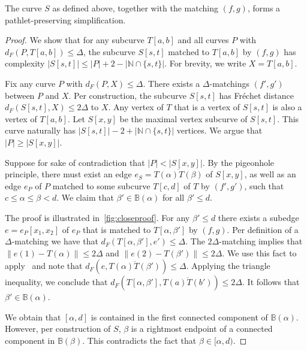 \documentclass[a4paper,UKenglish,cleveref,thm-restate,notab]{lipics-v2021}
\newcommand{\f}{Fr\'echet\xspace}
\newcommand{\dF}{\ensuremath{d_F}}
\newcommand{\N}{\mathbb{N}}
\newcommand{\B}{\mathbb{B}}
\begin{document}
    \begin{lemma}
    \label{lem:pathlet_preserving}
     The curve $S$ as defined above, together with the matching $(f, g)$, forms a pathlet-preserving simplification. 
    \end{lemma}
    \begin{proof}
        We show that for any subcurve $T[a, b]$ and all curves $P$ with $\dF(P, T[a, b]) \leq \Delta$, the subcurve $S[s, t]$ matched to $T[a, b]$ by $(f, g)$ has complexity $|S[s, t]| \leq |P| + 2 - |\N \cap \{s, t\}|$.
        For brevity, we write $X = T[a, b]$.
        
        Fix any curve $P$ with $\dF(P, X) \leq \Delta$. There exists a $\Delta$-matchings $(f', g')$ between $P$ and $X$.
        Per construction, the subcurve $S[s, t]$ has \f distance $\dF(S[s, t], X) \leq 2\Delta$ to $X$.
        Any vertex of $T$ that is a vertex of $S[s, t]$ is also a vertex of $T[a, b]$.
        Let $S[x, y]$ be the maximal vertex subcurve of $S[s, t]$.
        This curve naturally has $|S[s, t]| - 2 + |\N \cap \{s, t\}|$ vertices.
        We argue that $|P| \geq |S[x, y]|$.

        Suppose for sake of contradiction that $|P| < |S[x, y]|$.
        By the pigeonhole principle, there must exist an edge $e_S = \overline{T(\alpha) T(\beta)}$ of $S[x, y]$, as well as an edge $e_P$ of $P$ matched to some subcurve $T[c, d]$ of $T$ by $(f', g')$, such that $c \leq \alpha \leq \beta < d$.
        We claim that $\beta' \in \B(\alpha)$ for all $\beta' \leq d$.

        The proof is illustrated in~\cref{fig:closeproof}.
        For any $\beta' \leq d$ there exists a subedge $e = e_P[x_1, x_2]$ of $e_P$ that is matched to $T[\alpha, \beta']$ by $(f, g)$.
        Per definition of a $\Delta$-matching we have that $\dF(T[\alpha, \beta'], e') \leq \Delta$.
        The $2\Delta$-matching implies that $\lVert e(1) - T(\alpha) \rVert \leq 2\Delta$ and $\lVert e(2) - T(\beta') \rVert \leq 2\Delta$.
        We use this fact to apply~\cite[Lemma~3.1]{agarwal_near-linear_2005} and note that $\dF(e, \overline{T(\alpha)T(\beta')}) \leq \Delta$.
        Applying the triangle inequality, we conclude that $\dF(T[\alpha, \beta'], \overline{T(a)T(b')}) \leq 2 \Delta$. 
        It follows that $\beta' \in \B(\alpha)$. 
        
        We obtain that $[\alpha, d]$ is contained in the first connected component of $\B(\alpha)$. 
        However, per construction of $S$, $\beta$ is a rightmost endpoint of a connected component in $\B(\beta)$.
        This contradicts the fact that $\beta \in [\alpha, d)$.
    \end{proof}
    
\end{document}
